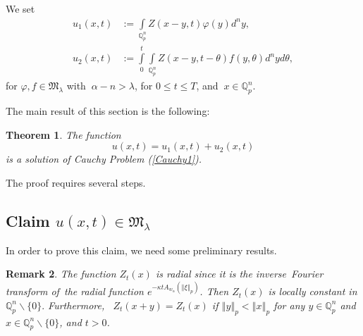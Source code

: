 \documentclass{amsart}\usepackage{amsfonts}
\newtheorem{theorem}{Theorem}[section]
\theoremstyle{plain}
\newtheorem{remark}[theorem]{Remark}
\numberwithin{equation}{section}
\begin{document}
We set\begin{align*}
u_{1}(x,t)  &  :=\underset{\mathbb{Q}_{p}^{n}}{\int}Z(x-y,t)\varphi
(y)d^{n}y\text{,}\\
u_{2}(x,t)  &  :={\displaystyle\int\limits_{0}^{t}}
\underset{\mathbb{Q}_{p}^{n}}{\int}Z(x-y,t-\theta)f(y,\theta)d^{n}yd\theta,
\end{align*}
for $\varphi,f\in\mathcal{\mathfrak{M}}_{\lambda}$ with $\ \alpha-n>\lambda$,
for $0\leq t\leq T$, and $\ x\in\mathbb{Q}_{p}^{n}$.

The main result of this section is the following:

\begin{theorem}
\label{Thm1}The function\[
u(x,t)=u_{1}(x,t)+u_{2}(x,t)
\]
is a solution of Cauchy Problem (\ref{Cauchy1}).
\end{theorem}

The proof requires several steps.

\subsection{\textbf{Claim} $u(x,t)\in\mathcal{\mathfrak{M}}_{\lambda}$}

In order to prove this claim, we need some preliminary results.

\begin{remark}
\label{Remark}The function $Z_{t}(x)$ is radial since it is the
inverse\ Fourier transform of\ the radial function $e^{-\kappa tA_{w_{\alpha}}(\left\Vert \xi\right\Vert _{p})}$. Then $Z_{t}(x)$ is locally constant in
$\mathbb{Q}_{p}^{n}\backslash\{0\}.$ Furthermore, \ $Z_{t}(x+y)=Z_{t}(x)$ if
$\left\Vert y\right\Vert _{p}<\left\Vert x\right\Vert _{p}$ for any
$y\in\mathbb{Q}_{p}^{n}$ and $x\in\mathbb{Q}_{p}^{n}\backslash\{0\}$, and
$t>0$.
\end{remark}
\end{document}
